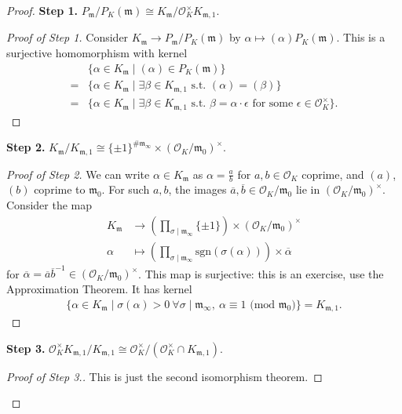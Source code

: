 \documentclass{article}
\theoremstyle{definition}
\begin{document}
\begin{proof}
    \textbf{Step 1.} $P_{\mathfrak{m}}/P_K(\mathfrak{m}) \cong K_{\mathfrak{m}}/\mathcal{O}_K^\times K_{\mathfrak{m},1}$.
    \begin{proof}[Proof of Step 1]
        Consider $K_{\mathfrak{m}} \to P_{\mathfrak{m}}/P_K(\mathfrak{m})$ by $\alpha \mapsto (\alpha)P_K(\mathfrak{m})$. This is a surjective homomorphism with kernel 
        \begin{align*}
            &\{\alpha \in K_{\mathfrak{m}}\mid  (\alpha) \in P_K(\mathfrak{m})\} \\
            =& \{\alpha \in K_{\mathfrak{m}} \mid \exists \beta \in K_{\mathfrak{m},1} \text{ s.t. }(\alpha)=(\beta)\} \\
            =& \{\alpha \in K_{\mathfrak{m}} \mid \exists \beta \in K_{\mathfrak{m},1} \text{ s.t. }\beta = \alpha\cdot \epsilon \text{ for some }\epsilon \in \mathcal{O}_K^\times\}.
        \end{align*}
    \end{proof}
    \textbf{Step 2.} $K_{\mathfrak{m}}/K_{\mathfrak{m},1} \cong \{\pm 1\}^{\# \mathfrak{m}_{\infty}} \times (\mathcal{O}_K/\mathfrak{m}_0)^\times$.
    \begin{proof}[Proof of Step 2]
        We can write $\alpha \in K_{\mathfrak{m}}$ as $\alpha = \frac{a}{b}$ for $a,b \in \mathcal{O}_K$ coprime, and $(a)$, $(b)$ coprime to $\mathfrak{m}_0$. For such $a,b$, the images $\overline{a},\overline{b} \in \mathcal{O}_K/\mathfrak{m}_0$ lie in $(\mathcal{O}_K/\mathfrak{m}_0)^\times$. Consider the map 
        \begin{align*}
            K_{\mathfrak{m}} &\to \left( \prod_{\sigma \mid \mathfrak{m}_{\infty}}^{} \{\pm 1\}\right) \times (\mathcal{O}_K/\mathfrak{m}_0)^\times\\
            \alpha &\mapsto \left(\prod_{\sigma \mid \mathfrak{m}_{\infty}}^{} \text{sgn}(\sigma(\alpha)) \right) \times \overline{\alpha}
        \end{align*}
        for $\overline{\alpha} = \overline{a} \overline{b}^{-1} \in (\mathcal{O}_K/\mathfrak{m}_0)^\times$. This map is surjective: this is an exercise, use the Approximation Theorem. It has kernel 
        \begin{align*}
            \{\alpha \in K_{\mathfrak{m}}\mid \sigma(\alpha) > 0 ~\forall \sigma \mid \mathfrak{m}_{\infty}, ~\alpha \equiv 1 \text{ (mod }\mathfrak{m}_0)\} = K_{\mathfrak{m},1}.
        \end{align*}
    \end{proof}
    \textbf{Step 3.} $\mathcal{O}_K^\times K_{\mathfrak{m},1}/K_{\mathfrak{m},1} \cong \mathcal{O}_K^\times/(\mathcal{O}_K^\times \cap K_{\mathfrak{m},1})$.
    \begin{proof}[Proof of Step 3.]
        This is just the second isomorphism theorem.
    \end{proof}
    \vspace{1mm}
     

\end{proof}
\end{document}
